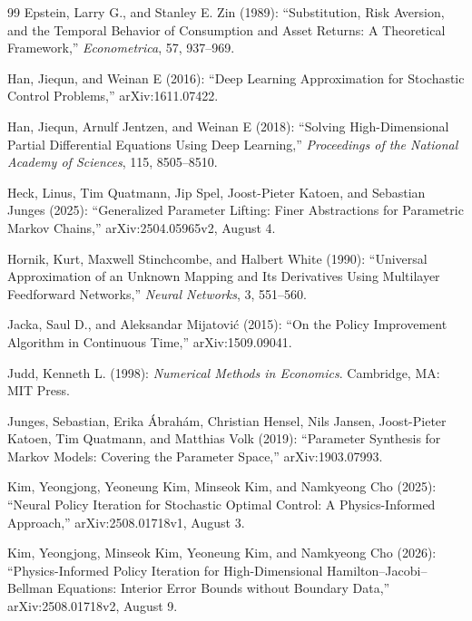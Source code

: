\begin{thebibliography}{99}
Epstein, Larry G., and Stanley E. Zin (1989): ``Substitution, Risk Aversion, and the Temporal Behavior of Consumption and Asset Returns: A Theoretical Framework,'' \emph{Econometrica}, 57, 937--969.

Han, Jiequn, and Weinan E (2016): ``Deep Learning Approximation for Stochastic Control Problems,'' arXiv:1611.07422.

Han, Jiequn, Arnulf Jentzen, and Weinan E (2018): ``Solving High-Dimensional Partial Differential Equations Using Deep Learning,'' \emph{Proceedings of the National Academy of Sciences}, 115, 8505--8510.

Heck, Linus, Tim Quatmann, Jip Spel, Joost-Pieter Katoen, and Sebastian Junges (2025): ``Generalized Parameter Lifting: Finer Abstractions for Parametric Markov Chains,'' arXiv:2504.05965v2, August 4.

Hornik, Kurt, Maxwell Stinchcombe, and Halbert White (1990): ``Universal Approximation of an Unknown Mapping and Its Derivatives Using Multilayer Feedforward Networks,'' \emph{Neural Networks}, 3, 551--560.

Jacka, Saul D., and Aleksandar Mijatovi\'c (2015): ``On the Policy Improvement Algorithm in Continuous Time,'' arXiv:1509.09041.

Judd, Kenneth L. (1998): \emph{Numerical Methods in Economics}. Cambridge, MA: MIT Press.

Junges, Sebastian, Erika \'Abrah\'am, Christian Hensel, Nils Jansen, Joost-Pieter Katoen, Tim Quatmann, and Matthias Volk (2019): ``Parameter Synthesis for Markov Models: Covering the Parameter Space,'' arXiv:1903.07993.

Kim, Yeongjong, Yeoneung Kim, Minseok Kim, and Namkyeong Cho (2025): ``Neural Policy Iteration for Stochastic Optimal Control: A Physics-Informed Approach,'' arXiv:2508.01718v1, August 3.

Kim, Yeongjong, Minseok Kim, Yeoneung Kim, and Namkyeong Cho (2026): ``Physics-Informed Policy Iteration for High-Dimensional Hamilton--Jacobi--Bellman Equations: Interior Error Bounds without Boundary Data,'' arXiv:2508.01718v2, August 9.


\end{thebibliography}
